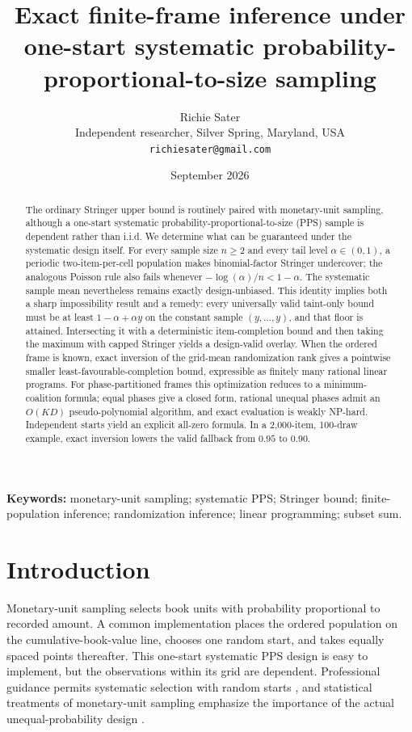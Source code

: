 \documentclass[11pt]{article}
\title{Exact finite-frame inference under one-start systematic
probability-proportional-to-size sampling}
\author{Richie Sater\\
\small Independent researcher, Silver Spring, Maryland, USA\\
\small \texttt{richiesater@gmail.com}}
\date{September 2026}
\theoremstyle{definition}
\begin{document}
\maketitle

\begin{abstract}
The ordinary Stringer upper bound is routinely paired with monetary-unit
sampling, although a one-start systematic probability-proportional-to-size
(PPS) sample is dependent rather than i.i.d.  We determine what can be
guaranteed under the systematic design itself.  For every sample size
$n\ge2$ and every tail level $\alpha\in(0,1)$, a periodic two-item-per-cell
population makes binomial-factor Stringer undercover; the analogous
Poisson rule also fails whenever $-\log(\alpha)/n<1-\alpha$.  The systematic
sample mean nevertheless remains exactly design-unbiased.  This identity
implies both a sharp impossibility result and a remedy: every universally
valid taint-only bound must be at least $1-\alpha+\alpha y$ on the constant
sample $(y,\ldots,y)$, and that floor is attained.  Intersecting it with a
deterministic item-completion bound and then taking the maximum with capped
Stringer yields a design-valid overlay.  When the ordered frame is known,
exact inversion of the grid-mean randomization rank gives a pointwise
smaller least-favourable-completion bound, expressible as finitely many
rational linear programs.  For phase-partitioned frames this optimization
reduces to a minimum-coalition formula; equal phases give a closed form,
rational unequal phases admit an $O(KD)$ pseudo-polynomial algorithm, and
exact evaluation is weakly NP-hard.  Independent starts yield an explicit
all-zero formula.  In a 2,000-item, 100-draw example, exact inversion lowers
the valid fallback from $0.95$ to $0.90$.
\end{abstract}

\noindent\textbf{Keywords:} monetary-unit sampling; systematic PPS;
Stringer bound; finite-population inference; randomization inference;
linear programming; subset sum.

\section{Introduction}

Monetary-unit sampling selects book units with probability proportional to
recorded amount.  A common implementation places the ordered population on
the cumulative-book-value line, chooses one random start, and takes equally
spaced points thereafter.  This one-start systematic PPS design is easy to
implement, but the observations within its grid are dependent.  Professional
guidance permits systematic selection with random starts \cite{pcaob2315},
and statistical treatments of monetary-unit sampling emphasize the
importance of the actual unequal-probability design \cite{berger2021}.
\end{document}
